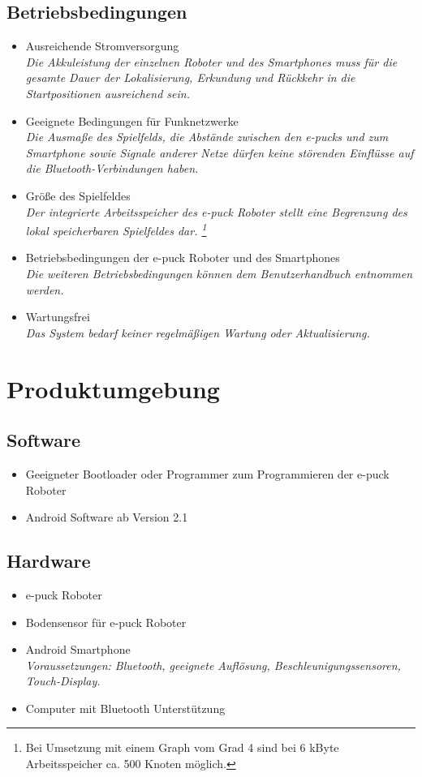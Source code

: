 \documentclass[10pt,a4paper]{article}
\begin{document}
		\subsection{Betriebsbedingungen}
			\begin{itemize}
				\item Ausreichende Stromversorgung
					\\ \textsl{Die Akkuleistung der einzelnen Roboter und des Smartphones muss für die gesamte
						Dauer der Lokalisierung, Erkundung und Rückkehr in die Startpositionen ausreichend sein.}
				\item Geeignete Bedingungen für Funknetzwerke
					\\ \textsl{Die Ausmaße des Spielfelds, die Abstände zwischen den e-pucks und zum Smartphone sowie
						Signale anderer Netze dürfen keine störenden Einflüsse auf die Bluetooth-Verbindungen haben.}
				\item Größe des Spielfeldes
					\\ \textsl{Der integrierte Arbeitsspeicher des e-puck Roboter stellt eine Begrenzung des lokal
					 speicherbaren Spielfeldes dar. \footnote{Bei Umsetzung mit einem Graph vom Grad 4 sind bei 6 kByte Arbeitsspeicher
					 	ca. 500 Knoten möglich.} }
				\item Betriebsbedingungen der e-puck Roboter und des Smartphones
					\\ \textsl{Die weiteren Betriebsbedingungen können dem Benutzerhandbuch entnommen werden.}			
				\item Wartungsfrei
					\\ \textsl{Das System bedarf keiner regelmäßigen Wartung oder Aktualisierung.}		
			\end{itemize}
	\section{Produktumgebung}
		\subsection{Software}
			\begin{itemize}
				\item Geeigneter Bootloader oder Programmer zum Programmieren der e-puck Roboter
				\item Android Software ab Version 2.1
			\end{itemize}
		\subsection{Hardware}
			\begin{itemize}
				\item e-puck Roboter
				\item Bodensensor für e-puck Roboter
				\item Android Smartphone
					\\ \textsl{Voraussetzungen: Bluetooth, geeignete Auflösung, Beschleunigungssensoren, Touch-Display.}
				\item Computer mit Bluetooth Unterstützung
			\end{itemize}		
\end{document}
